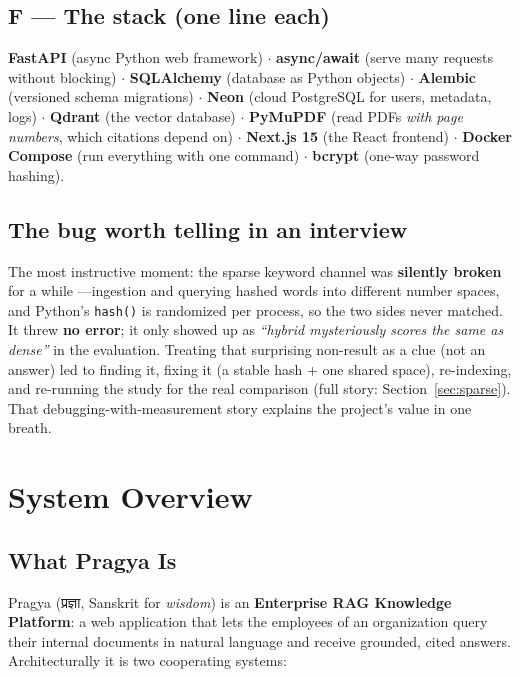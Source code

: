 \documentclass[11pt,a4paper,oneside]{report}
\newcommand{\code}[1]{\texttt{#1}}
\begin{document}
\section{F --- The stack (one line each)}
\textbf{FastAPI} (async Python web framework) $\cdot$ \textbf{async/await} (serve many requests without
blocking) $\cdot$ \textbf{SQLAlchemy} (database as Python objects) $\cdot$ \textbf{Alembic} (versioned
schema migrations) $\cdot$ \textbf{Neon} (cloud PostgreSQL for users, metadata, logs) $\cdot$
\textbf{Qdrant} (the vector database) $\cdot$ \textbf{PyMuPDF} (read PDFs \emph{with page numbers}, which
citations depend on) $\cdot$ \textbf{Next.js 15} (the React frontend) $\cdot$ \textbf{Docker Compose}
(run everything with one command) $\cdot$ \textbf{bcrypt} (one-way password hashing).

\section{The bug worth telling in an interview}
The most instructive moment: the sparse keyword channel was \textbf{silently broken} for a while
---ingestion and querying hashed words into different number spaces, and Python's \code{hash()} is
randomized per process, so the two sides never matched. It threw \textbf{no error}; it only showed up as
\emph{``hybrid mysteriously scores the same as dense''} in the evaluation. Treating that surprising
non-result as a clue (not an answer) led to finding it, fixing it (a stable hash + one shared space),
re-indexing, and re-running the study for the real comparison (full story: Section~\ref{sec:sparse}).
That debugging-with-measurement story explains the project's value in one breath.

\chapter{System Overview}
\label{ch:overview}

\section{What Pragya Is}
Pragya (प्रज्ञा, Sanskrit for \emph{wisdom}) is an \textbf{Enterprise RAG Knowledge Platform}:
a web application that lets the employees of an organization query their internal documents in
natural language and receive grounded, cited answers. Architecturally it is two cooperating
systems:
\end{document}
